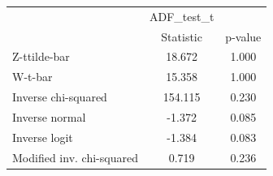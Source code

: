 \begin{tabular}{l*{2}{c}}
\hline\hline
            &  ADF\_test\_t&            \\
            &   Statistic&     p-value\\
\hline
Z-ttilde-bar&      18.672&       1.000\\
W-t-bar     &      15.358&       1.000\\
Inverse chi-squared&     154.115&       0.230\\
Inverse normal&      -1.372&       0.085\\
Inverse logit&      -1.384&       0.083\\
Modified inv. chi-squared&       0.719&       0.236\\
\hline\hline
\end{tabular}
